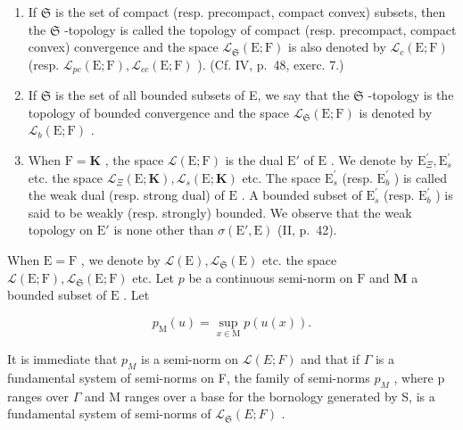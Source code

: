 \begin{enumerate}
\def\labelenumi{\arabic{enumi})}
\setcounter{enumi}{1}
\item
  If \(\mathfrak{S}\) is the set of compact (resp. precompact, compact convex) subsets, then the \(\mathfrak{S}\) -topology is called the topology of compact (resp. precompact, compact convex) convergence and the space \(\mathcal{L}_{\mathfrak{S}}(\mathrm{E};\mathrm{F})\) is also denoted by \(\mathcal{L}_c(\mathrm{E};\mathrm{F})\) (resp. \(\mathcal{L}_{pc}(\mathrm{E};\mathrm{F}),\mathcal{L}_{cc}(\mathrm{E};\mathrm{F})\) ). (Cf. IV, p.~48, exerc. 7.)
\item
  If \(\mathfrak{S}\) is the set of all bounded subsets of E, we say that the \(\mathfrak{S}\) -topology is the topology of bounded convergence and the space \(\mathcal{L}_{\mathfrak{S}}(\mathrm{E};\mathrm{F})\) is denoted by \(\mathcal{L}_b(\mathrm{E};\mathrm{F})\) .
\item
  When \(\mathrm{F} = \mathbf{K}\) , the space \(\mathcal{L}(\mathrm{E};\mathrm{F})\) is the dual \(\mathrm{E}'\) of \(\mathrm{E}\) . We denote by \(\mathrm{E}_{\Xi}^{\prime}, \mathrm{E}_{s}^{\prime}\) etc. the space \(\mathcal{L}_{\Xi}(\mathrm{E};\mathbf{K}), \mathcal{L}_s(\mathrm{E};\mathbf{K})\) etc. The space \(\mathrm{E}_s^\prime\) (resp. \(\mathrm{E}_b^\prime\) ) is called the weak dual (resp. strong dual) of \(\mathrm{E}\) . A bounded subset of \(\mathrm{E}_s^\prime\) (resp. \(\mathrm{E}_b^\prime\) ) is said to be weakly (resp. strongly) bounded. We observe that the weak topology on \(\mathrm{E}'\) is none other than \(\sigma (\mathrm{E}',\mathrm{E})\) (II, p.~42).
\end{enumerate}

When \(\mathrm{E} = \mathrm{F}\) , we denote by \(\mathcal{L}(\mathrm{E}), \mathcal{L}_{\mathfrak{S}}(\mathrm{E})\) etc. the space \(\mathcal{L}(\mathrm{E};\mathrm{F}), \mathcal{L}_{\mathfrak{S}}(\mathrm{E};\mathrm{F})\) etc. Let \(p\) be a continuous semi-norm on \(\mathrm{F}\) and \(\mathbf{M}\) a bounded subset of \(\mathrm{E}\) . Let

\[
p _ {\mathrm{M}} (u) = \sup _ {x \in \mathrm{M}} p (u (x)).\tag{1}
\]

It is immediate that \(p_{M}\) is a semi-norm on \(\mathcal{L}(E;F)\) and that if \(\Gamma\) is a fundamental system of semi-norms on F, the family of semi-norms \(p_{M}\) , where p ranges over \(\Gamma\) and M ranges over a base for the bornology generated by S, is a fundamental system of semi-norms of \(\mathcal{L}_{\mathfrak{S}}(E;F)\) .

